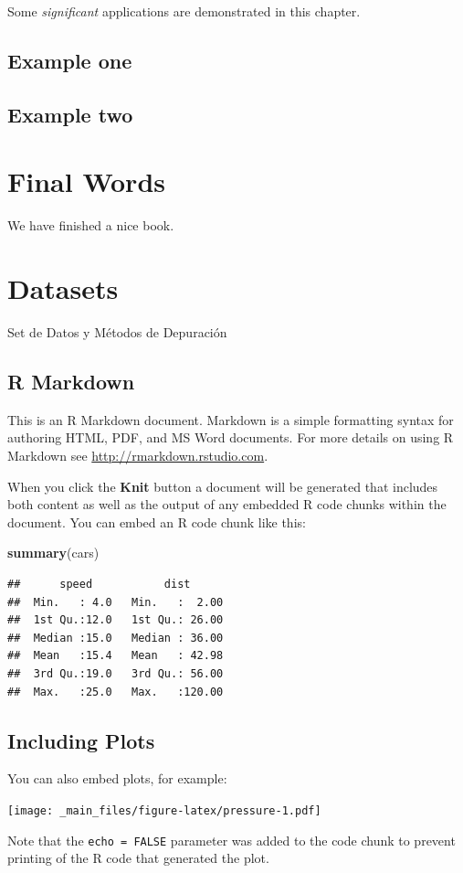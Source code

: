 \documentclass[]{article}
\newenvironment{Shaded}{\begin{snugshade}}{\end{snugshade}}
\newcommand{\KeywordTok}[1]{\textcolor[rgb]{0.13,0.29,0.53}{\textbf{#1}}}
\newcommand{\NormalTok}[1]{#1}
\begin{document}
Some \emph{significant} applications are demonstrated in this chapter.

\subsection{Example one}\label{example-one}

\subsection{Example two}\label{example-two}

\section{Final Words}\label{final-words}

We have finished a nice book.

\section{Datasets}\label{datasets}

Set de Datos y Métodos de Depuración

\subsection{R Markdown}\label{r-markdown}

This is an R Markdown document. Markdown is a simple formatting syntax
for authoring HTML, PDF, and MS Word documents. For more details on
using R Markdown see \url{http://rmarkdown.rstudio.com}.

When you click the \textbf{Knit} button a document will be generated
that includes both content as well as the output of any embedded R code
chunks within the document. You can embed an R code chunk like this:

\begin{Shaded}
\begin{Highlighting}[]
\KeywordTok{summary}\NormalTok{(cars)}
\end{Highlighting}
\end{Shaded}

\begin{verbatim}
##      speed           dist       
##  Min.   : 4.0   Min.   :  2.00  
##  1st Qu.:12.0   1st Qu.: 26.00  
##  Median :15.0   Median : 36.00  
##  Mean   :15.4   Mean   : 42.98  
##  3rd Qu.:19.0   3rd Qu.: 56.00  
##  Max.   :25.0   Max.   :120.00
\end{verbatim}

\subsection{Including Plots}\label{including-plots}

You can also embed plots, for example:

\texttt{[image: \_main\_files/figure-latex/pressure-1.pdf]}

Note that the \texttt{echo\ =\ FALSE} parameter was added to the code
chunk to prevent printing of the R code that generated the plot.

\printbibliography
\end{document}
